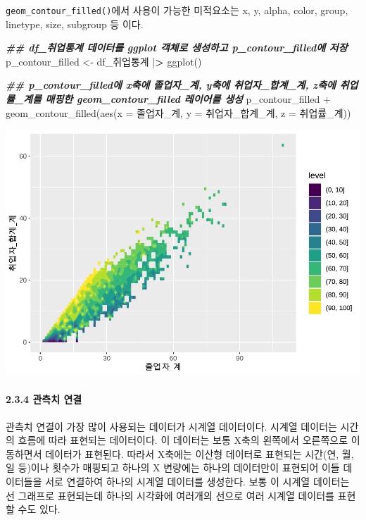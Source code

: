 \documentclass[
]{article}
\newenvironment{Shaded}{\begin{snugshade}}{\end{snugshade}}
\newcommand{\AttributeTok}[1]{\textcolor[rgb]{0.77,0.63,0.00}{#1}}
\newcommand{\DocumentationTok}[1]{\textcolor[rgb]{0.56,0.35,0.01}{\textbf{\textit{#1}}}}
\newcommand{\ErrorTok}[1]{\textcolor[rgb]{0.64,0.00,0.00}{\textbf{#1}}}
\newcommand{\FunctionTok}[1]{\textcolor[rgb]{0.00,0.00,0.00}{#1}}
\newcommand{\NormalTok}[1]{#1}
\newcommand{\OtherTok}[1]{\textcolor[rgb]{0.56,0.35,0.01}{#1}}
\newcommand{\SpecialCharTok}[1]{\textcolor[rgb]{0.00,0.00,0.00}{#1}}
\begin{document}
\texttt{geom\_contour\_filled()}에서 사용이 가능한 미적요소는 x, y, alpha, color, group, linetype, size, subgroup 등 이다.

\begin{Shaded}
\begin{Highlighting}[]
\DocumentationTok{\#\#  df\_취업통계 데이터를 ggplot 객체로 생성하고 p\_contour\_filled에 저장}
\NormalTok{p\_contour\_filled }\OtherTok{\textless{}{-}}\NormalTok{ df\_취업통계 }\SpecialCharTok{|}\ErrorTok{\textgreater{}}
  \FunctionTok{ggplot}\NormalTok{()}

\DocumentationTok{\#\# p\_contour\_filled에 x축에 졸업자\_계, y축에 취업자\_합계\_계, z축에 취업률\_계를 매핑한 geom\_contour\_filled 레이어를 생성}
\NormalTok{p\_contour\_filled }\SpecialCharTok{+} 
  \FunctionTok{geom\_contour\_filled}\NormalTok{(}\FunctionTok{aes}\NormalTok{(}\AttributeTok{x =}\NormalTok{ 졸업자\_계, }\AttributeTok{y =}\NormalTok{ 취업자\_합계\_계, }\AttributeTok{z =}\NormalTok{ 취업률\_계))}
\end{Highlighting}
\end{Shaded}

\includegraphics{chap3_files/figure-latex/unnamed-chunk-46-1.pdf}

\hypertarget{uxad00uxce21uxce58-uxc5f0uxacb0}{%
\paragraph{2.3.4 관측치 연결}\label{uxad00uxce21uxce58-uxc5f0uxacb0}}

관측치 연결이 가장 많이 사용되는 데이터가 시계열 데이터이다. 시계열 데이터는 시간의 흐름에 따라 표현되는 데이터이다. 이 데이터는 보통 X축의 왼쪽에서 오른쪽으로 이동하면서 데이터가 표현된다. 따라서 X축에는 이산형 데이터로 표현되는 시간(연, 월, 일 등)이나 횟수가 매핑되고 하나의 X 변량에는 하나의 데이터만이 표현되어 이들 데이터들을 서로 연결하여 하나의 시계열 데이터를 생성한다. 보통 이 시계열 데이터는 선 그래프로 표현되는데 하나의 시각화에 여러개의 선으로 여러 시계열 데이터를 표현할 수도 있다.
\end{document}
